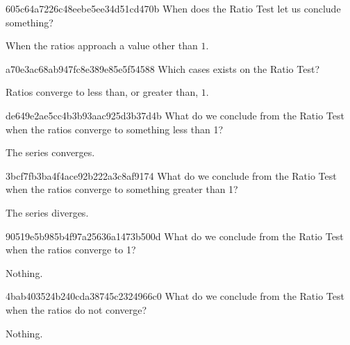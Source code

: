 \begin{note}{605c64a7226c48eebe5ee34d51cd470b}
    When does the Ratio Test let us conclude something?

    \begin{cloze}{1}
        When the ratios approach a value other than \({ 1 }\).
    \end{cloze}
\end{note}

\begin{note}{a70e3ac68ab947fc8e389e85e5f54588}
    Which cases exists on the Ratio Test?

    \begin{cloze}{1}
        Ratios converge to less than, or greater than, \({ 1 }\).
    \end{cloze}
\end{note}

\begin{note}{de649e2ae5cc4b3b93aac925d3b37d4b}
    What do we conclude from the Ratio Test when the ratios converge to something less than 1?

    \begin{cloze}{1}
        The series converges.
    \end{cloze}
\end{note}

\begin{note}{3bcf7fb3ba4f4ace92b222a3c8af9174}
    What do we conclude from the Ratio Test when the ratios converge to something greater than 1?

    \begin{cloze}{1}
        The series diverges.
    \end{cloze}
\end{note}

\begin{note}{90519e5b985b4f97a25636a1473b500d}
    What do we conclude from the Ratio Test when the ratios converge to 1?

    \begin{cloze}{1}
        Nothing.
    \end{cloze}
\end{note}

\begin{note}{4bab403524b240cda38745c2324966c0}
    What do we conclude from the Ratio Test when the ratios do not converge?

    \begin{cloze}{1}
        Nothing.
    \end{cloze}
\end{note}

